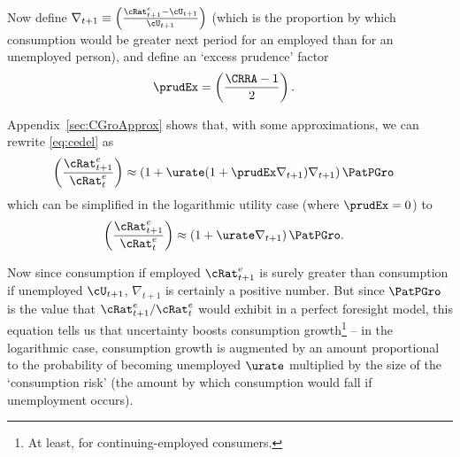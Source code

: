 \documentclass{\handout}
\begin{document}


Now define $\nabla _{t+1} \equiv
\left(\frac{{\cRat}^{e}_{t+1}-\cU_{t+1}}{\cU_{t+1}}\right)$ (which is
the proportion by which consumption would
be greater next period for an employed than for an 
unemployed person), and define an `excess prudence' factor
\begin{equation}\begin{gathered}\begin{aligned}
  \prudEx & =  \left(\frac{\CRRA-1}{2}\right).
\end{aligned}\end{gathered}\end{equation}

Appendix~\ref{sec:CGroApprox} shows that, with some approximations, we can rewrite \eqref{eq:cedel} as
\begin{equation}\begin{gathered}\begin{aligned}
         \left(\frac{{\cRat}^{e}_{t+1}}{{\cRat}^{e}_{t}}\right) & \approx  \left(1+ \urate (1+\prudEx\nabla _{t+1})\nabla _{t+1}\right) {\PatPGro}
         \label{eq:cedelapprox}
\end{aligned}\end{gathered}\end{equation}
which can be simplified in the logarithmic utility case (where $\prudEx = 0$) to
\begin{equation}\begin{gathered}\begin{aligned}
         \left(\frac{{\cRat}^{e}_{t+1}}{{\cRat}^{e}_{t}}\right) & \approx  \left(1+ \urate \nabla _{t+1}\right) {\PatPGro} \label{eq:cedelapproxLog}. 
\end{aligned}\end{gathered}\end{equation}

Now since consumption if employed ${\cRat}^{e}_{t+1}$ is surely greater than consumption if unemployed $\cU_{t+1}$, $\nabla _{t+1}$ is certainly a positive number.  But since ${\PatPGro}$ is the value that ${\cRat}^{e}_{t+1}/{\cRat}^{e}_{t}$ would exhibit in a perfect foresight model, this equation tells us that uncertainty boosts consumption growth\footnote{At least, for continuing-employed consumers.} -- in the logarithmic case, consumption growth is augmented by an amount proportional to the probability of becoming unemployed $\urate$ multiplied by the size of the `consumption risk' (the amount by which consumption would fall if unemployment occurs).
\end{document}
